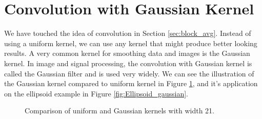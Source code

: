 \documentclass[a4paper,10pt]{report}
\begin{document}
\section{Convolution with Gaussian Kernel}

We have touched the idea of convolution in Section \ref{sec:block_avg}. Instead of using a uniform kernel, we can use any kernel that might produce better looking results. A very common kernel for smoothing data and images is the Gaussian kernel. In image and signal processing, the convolution with Gaussian kernel is called the Gaussian filter and is used very widely. We can see the illustration of the Gaussian kernel compared to uniform kernel in Figure \ref{fig:kernel_comparison}, and it's application on the ellipsoid example in Figure \ref{fig:Ellipsoid_gaussian}.
\begin{figure}[H]
    \centering
    
    \caption{Comparison of uniform and Gaussian kernels with width 21.}
    \label{fig:kernel_comparison}
\end{figure}
\end{document}
